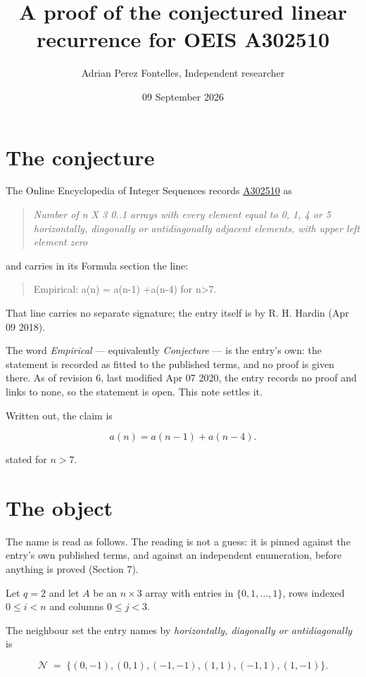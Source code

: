 \documentclass[11pt]{article}
\title{A proof of the conjectured linear recurrence for OEIS A302510}
\author{Adrian Perez Fontelles, Independent researcher}
\date{09 September 2026}
\theoremstyle{definition}
\begin{document}
\maketitle
\section{The conjecture}

The Online Encyclopedia of Integer Sequences records \href{https://oeis.org/A302510}{A302510} as

\begin{quote}\itshape Number of n X 3 0..1 arrays with every element equal to 0, 1, 4 or 5 horizontally, diagonally or antidiagonally adjacent elements, with upper left element zero\end{quote}

and carries in its Formula section the line:

\begin{quote}\ttfamily Empirical: a(n) = a(n-1) +a(n-4) for n>7.\end{quote}

That line carries no separate signature; the entry itself is by R. H. Hardin (Apr 09 2018).

The word {\itshape Empirical} --- equivalently {\itshape Conjecture} --- is the entry's own: the statement is recorded as fitted to the published terms, and no proof is given there. As of revision 6, last modified Apr 07 2020, the entry records no proof and links to none, so the statement is open. This note settles it.

Written out, the claim is

\[a(n) = a(n-1) + a(n-4).\]

stated for $n > 7$.

\section{The object}

The name is read as follows. The reading is not a guess: it is pinned against the entry's own published terms, and against an independent enumeration, before anything is proved (Section 7).

Let $q = 2$ and let $A$ be an $n \times 3$ array with entries in $\{0,1,\dots,1\}$, rows indexed $0 \le i < n$ and columns $0 \le j < 3$.

The neighbour set the entry names by {\itshape horizontally, diagonally or antidiagonally} is

\[\mathcal{N} \;=\; \{(0,-1), (0,1), (-1,-1), (1,1), (-1,1), (1,-1)\}.\]
\end{document}
